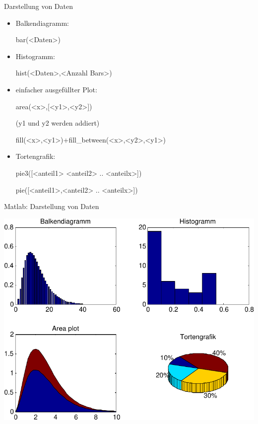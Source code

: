\documentclass[hyperref={xetex}]{beamer}
\begin{document}
% 
% 
\begin{frame}[fragile]{Darstellung von Daten}
\begin{itemize}
\item Balkendiagramm:
\begin{matlabin}
bar(<Daten>) 
\end{matlabin}
\item Histogramm: 
\begin{matlabin}
hist(<Daten>,<Anzahl Bars>)
\end{matlabin}
\item einfacher ausgefüllter Plot: 
\begin{matlabin}
area(<x>,[<y1>,<y2>])
\end{matlabin}
(y1 und y2 werden addiert)
\begin{pyin}
fill(<x>,<y1>)+fill_between(<x>,<y2>,<y1>)
\end{pyin}
\item Tortengrafik: 
\begin{matlabin}
pie3([<anteil1> <anteil2> .. <anteilx>])
  \end{matlabin}
\begin{pyin}
pie([<anteil1>,<anteil2> .. <anteilx>])  
\end{pyin}
\end{itemize}
\end{frame}
% 
% 
\begin{frame}[fragile]{Matlab: Darstellung von Daten}
\begin{center}\includegraphics[height=0.8\textheight]{figures/darstellung_daten_2d}\end{center}
\end{frame}
\end{document}
